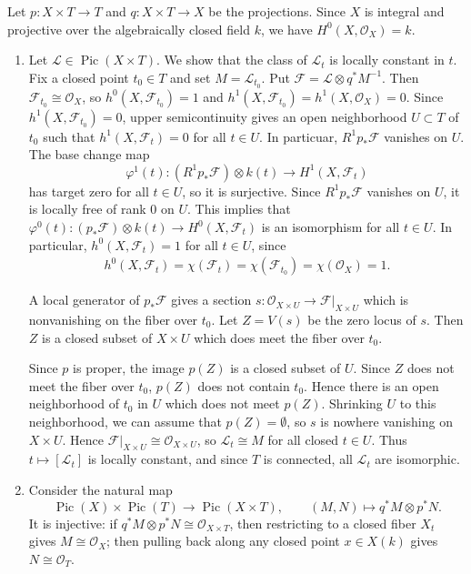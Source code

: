 \documentclass[12pt]{article}
\begin{document}
\begin{solution}
    Let $p:X\times T\to T$ and $q:X\times T\to X$ be the projections. Since $X$ is integral and projective over the algebraically closed field $k$, we have $H^0(X,\mathcal O_X)=k$.

    \begin{enumerate}
        \item Let $\mathcal L\in \operatorname{Pic}(X\times T)$. We show that the class of $\mathcal L_t$ is locally constant in $t$. Fix a closed point $t_0\in T$ and set $M=\mathcal L_{t_0}$. Put $\mathcal F=\mathcal L\otimes q^*M^{-1}$. Then $\mathcal F_{t_0}\cong \mathcal O_X$, so $h^0(X,\mathcal F_{t_0})=1$ and $h^1(X,\mathcal F_{t_0})=h^1(X,\mathcal O_X)=0$. Since $h^1(X,\mathcal F_{t_0})=0$, upper semicontinuity gives an open neighborhood $U\subset T$ of $t_0$ such that $h^1(X,\mathcal F_t)=0$ for all $t\in U$. In particuar, $R^1 p_*\mathcal F$ vanishes on $U$. The base change map \[
                  \varphi^1(t): (R^1 p_*\mathcal F)\otimes k(t) \longrightarrow H^1(X,\mathcal F_t)
              \] has target zero for all $t\in U$, so it is surjective. Since $R^1 p_*\mathcal F$ vanishes on $U$, it is locally free of rank $0$ on $U$. This implies that $\varphi^0(t): (p_*\mathcal F)\otimes k(t) \longrightarrow H^0(X,\mathcal F_t)$ is an isomorphism for all $t\in U$. In particular, $h^0(X,\mathcal F_t)=1$ for all $t\in U$, since \begin{align*}
                  h^0(X,\mathcal F_t)=\chi(\mathcal F_t)=\chi(\mathcal F_{t_0})=\chi(\mathcal O_X)=1.
              \end{align*}


              A local generator of $p_*\mathcal F$ gives a section $s:\mathcal O_{X\times U}\to \mathcal F|_{X\times U}$ which is nonvanishing on the fiber over $t_0$. Let $Z = V(s)$ be the zero locus of $s$. Then $Z$ is a closed subset of $X\times U$ which does meet the fiber over $t_0$.

              Since $p$ is proper, the image $p(Z)$ is a closed subset of $U$. Since $Z$ does not meet the fiber over $t_0$, $p(Z)$ does not contain $t_0$. Hence there is an open neighborhood of $t_0$ in $U$ which does not meet $p(Z)$. Shrinking $U$ to this neighborhood, we can assume that $p(Z)=\emptyset$, so $s$ is nowhere vanishing on $X\times U$. Hence $\mathcal F|_{X\times U}\cong \mathcal O_{X\times U}$, so $\mathcal L_t\cong M$ for all closed $t\in U$. Thus $t\mapsto [\mathcal L_t]$ is locally constant, and since $T$ is connected, all $\mathcal L_t$ are isomorphic.
        \item Consider the natural map
              \[
                  \operatorname{Pic}(X)\times \operatorname{Pic}(T)\to \operatorname{Pic}(X\times T),
                  \qquad
                  (M,N)\mapsto q^*M\otimes p^*N.
              \]
              It is injective: if $q^*M\otimes p^*N\cong \mathcal O_{X\times T}$, then restricting to a closed fiber $X_t$ gives $M\cong \mathcal O_X$; then pulling back along any closed point $x\in X(k)$ gives $N\cong \mathcal O_T$.


\end{enumerate}
\end{solution}
\end{document}
